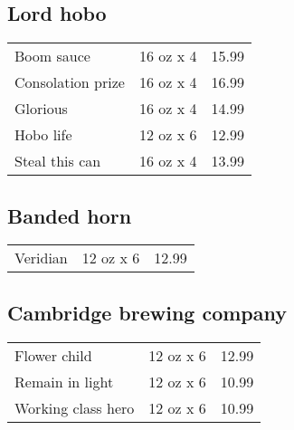 \documentclass{article}%
\begin{document}
\begin{multicols}{3}
%
\subsection*{Lord hobo}%
\begin{tabular}{>{\raggedright}p{16ex\hangindent=3ex} c r}%
Boom sauce&16 oz x 4&15.99\\%
Consolation prize&16 oz x 4&16.99\\%
Glorious&16 oz x 4&14.99\\%
Hobo life&12 oz x 6&12.99\\%
Steal this can&16 oz x 4&13.99\\%
\end{tabular}

%
\subsection*{Banded horn}%
\begin{tabular}{>{\raggedright}p{16ex\hangindent=3ex} c r}%
Veridian&12 oz x 6&12.99\\%
\end{tabular}

%
\subsection*{Cambridge brewing company}%
\begin{tabular}{>{\raggedright}p{16ex\hangindent=3ex} c r}%
Flower child&12 oz x 6&12.99\\%
Remain in light&12 oz x 6&10.99\\%
Working class hero&12 oz x 6&10.99\\%
\end{tabular}

%

\end{multicols}
\end{document}
